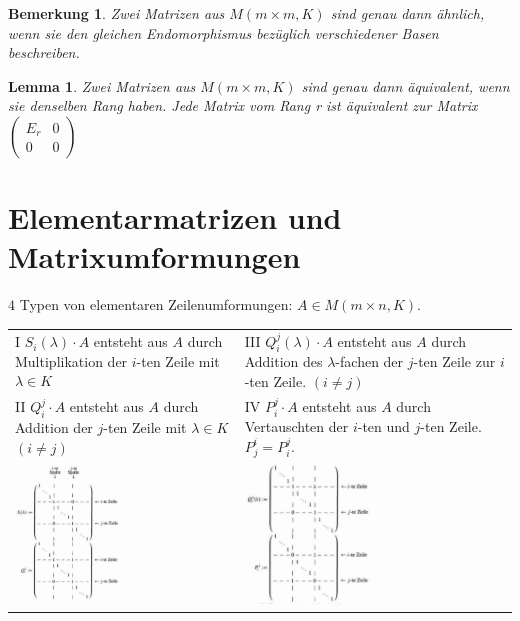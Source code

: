 \documentclass[12pt,a4paper]{article}
\theoremstyle{plain}
\newtheorem{Lemma}[Theorem]{Lemma}
\newtheorem{Bemerkung}[Theorem]{Bemerkung}
\numberwithin{equation}{section}
\begin{document}
\begin{Bemerkung}
Zwei Matrizen aus $M(m\times m,K)$ sind genau dann ähnlich, wenn sie den gleichen Endomorphismus bezüglich verschiedener Basen beschreiben.
\end{Bemerkung}
\begin{Lemma}
Zwei Matrizen aus $M(m\times m,K)$ sind genau dann äquivalent, wenn sie denselben Rang haben. Jede Matrix vom Rang r ist äquivalent zur Matrix $\left(\begin{matrix} E_r & 0 \\ 0 & 0 \end{matrix} \right)$
\end{Lemma}
\section{Elementarmatrizen und Matrixumformungen}
$4$ Typen von elementaren Zeilenumformungen: $A\in M(m\times n,K)$. \\
\begin{tabular}{p{} p{}}
I $S_i(\lambda)\cdot A$ entsteht aus $A$ durch Multiplikation der $i$-ten Zeile mit $\lambda \in K$ & III $Q^j_i(\lambda)\cdot A$ entsteht aus $A$ durch Addition des $\lambda$-fachen der $j$-ten Zeile zur $i$-ten Zeile. $(i\neq j)$ \\ II $Q^j_i\cdot A$ entsteht aus $A$ durch Addition der $j$-ten Zeile mit $\lambda \in K$ $(i\neq j)$ & IV $P^j_i\cdot A$ entsteht aus $A$ durch Vertauschten der $i$-ten und $j$-ten Zeile. $P^i_j=P^j_i$. \\
\includegraphics[width= 0.48\textwidth]{pics/ElMa1.png} & \includegraphics[width= 0.48\textwidth]{pics/ElMa2.png}
\end{tabular}
\end{document}
